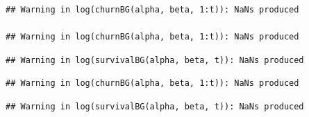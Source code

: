 \documentclass[
]{book}
\newenvironment{Shaded}{\begin{snugshade}}{\end{snugshade}}
\newcommand{\AttributeTok}[1]{\textcolor[rgb]{0.77,0.63,0.00}{#1}}
\newcommand{\DecValTok}[1]{\textcolor[rgb]{0.00,0.00,0.81}{#1}}
\newcommand{\FunctionTok}[1]{\textcolor[rgb]{0.00,0.00,0.00}{#1}}
\newcommand{\NormalTok}[1]{#1}
\newcommand{\OtherTok}[1]{\textcolor[rgb]{0.56,0.35,0.01}{#1}}
\newcommand{\SpecialCharTok}[1]{\textcolor[rgb]{0.00,0.00,0.00}{#1}}
\newcommand{\StringTok}[1]{\textcolor[rgb]{0.31,0.60,0.02}{#1}}
\begin{document}
\begin{Shaded}
\end{Shaded}

\begin{verbatim}
## Warning in log(churnBG(alpha, beta, 1:t)): NaNs produced

## Warning in log(churnBG(alpha, beta, 1:t)): NaNs produced
\end{verbatim}

\begin{verbatim}
## Warning in log(survivalBG(alpha, beta, t)): NaNs produced
\end{verbatim}

\begin{verbatim}
## Warning in log(churnBG(alpha, beta, 1:t)): NaNs produced
\end{verbatim}

\begin{verbatim}
## Warning in log(survivalBG(alpha, beta, t)): NaNs produced
\end{verbatim}
\end{document}

